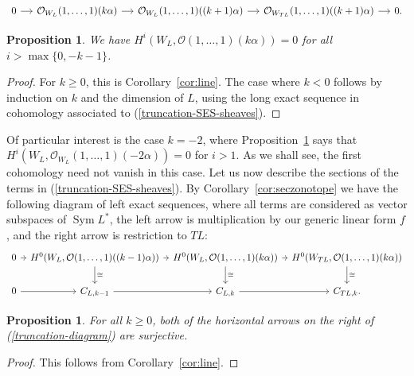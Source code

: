 \documentclass{amsart}
\newtheorem{proposition}[theorem]{Proposition}
\newcommand{\Sym}{\operatorname{Sym}}
\theoremstyle{definition}
\begin{document}
\begin{equation}\label{truncation-SES-sheaves}
\begin{tikzcd}[column sep = small]
0 \arrow[r] & {\mathcal{O}_{W_{L}}(1, \ldots,             
        1)(k\alpha)} \arrow[r] & 
        \mathcal{O}_{W_L}(1, \ldots, 1)((k+1)\alpha)
        \arrow[r]  & 
        \mathcal{O}_{W_{TL}}(1, \ldots, 1)((k+1)\alpha) \arrow[r] & 0.
\end{tikzcd}
\end{equation}

\begin{proposition}\label{negative-k-vanishing}
    We have $H^i(W_L, \mathcal{O}(1, \ldots, 1)(k\alpha)) = 0$ for all $i > 
    \max\{0,-k-1\}$.
\end{proposition}
\begin{proof}
    For $k \geq 0$, this is Corollary~\ref{cor:line}. The case where $k 
    < 0$ follows by induction on $k$ and the dimension of $L$, using the long exact 
    sequence in cohomology associated to (\ref{truncation-SES-sheaves}).
\end{proof}
Of particular interest is the case $k=-2$, where 
Proposition~\ref{negative-k-vanishing} says that 
$H^i(W_L, \mathcal{O}_{W_L}(1, \ldots, 1)(-2\alpha)) = 0$ for $i > 1$. As we 
shall see, the first cohomology need not vanish in this case. Let us 
now describe the sections of the terms in (\ref{truncation-SES-sheaves}). By 
Corollary~\ref{cor:seczonotope} we have the following diagram of 
left exact sequences, where all terms are considered as vector subspaces 
of $\Sym L^*$, the left arrow is multiplication by our generic linear form $f$, and the right 
arrow is restriction to $TL$:
\begin{equation}\label{truncation-diagram}
\begin{tikzcd}[column sep = tiny]
0 \arrow[r] & {H^0(W_L, \mathcal{O}(1, \ldots,             
        1)((k-1)\alpha))} \arrow[r] \arrow[d, "\cong"] & 
        {H^0(W_L, \mathcal{O}(1, \ldots, 1)(k\alpha))} 
        \arrow[r] \arrow[d, "\cong"] & 
        {H^0(W_{TL}, \mathcal{O}(1, \ldots, 1)(k\alpha))} 
        \arrow[d, "\cong"]\\
0 \arrow[r] & C_{L, k-1} \arrow[r] & C_{L, k} \arrow[r]  & C_{TL, k}.
\end{tikzcd}
\end{equation}

\begin{proposition}\label{truncation-corollary}
    For all $k \geq 0$, both of the horizontal arrows on the right of 
    (\ref{truncation-diagram}) are surjective.
\end{proposition}
\begin{proof}
This follows from Corollary~\ref{cor:line}.
\end{proof}
\end{document}
